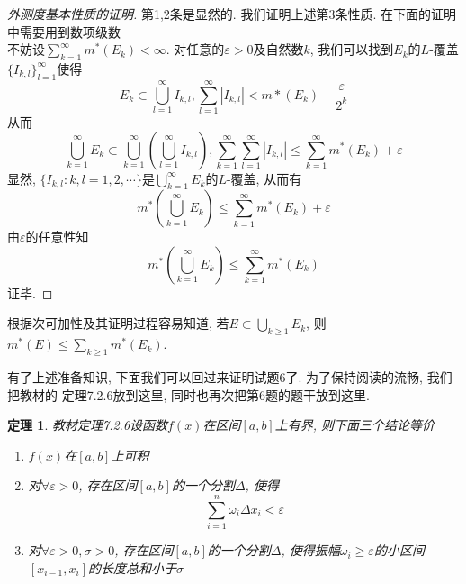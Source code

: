 \documentclass[a4paper,12pt]{article}
\theoremstyle{nonumberplain}
\newtheorem{theorem}{定理}
\begin{document}
\begin{proof}[外测度基本性质的证明]
  第1,2条是显然的. 我们证明上述第3条性质. 在下面的证明中需要用到数项级数 \\
  不妨设$\sum_{k=1}^{\infty}m^*(E_k)<\infty$. 对任意的$\varepsilon>0$及自然数$k$, 
  我们可以找到$E_k$的$L$-覆盖$\{I_{k,l}\}_{l=1}^{\infty}$使得
  \[E_k\subset\bigcup_{l=1}^{\infty}I_{k,l},\sum_{l=1}^{\infty}|I_{k,l}|<m*(E_k)+\frac{\varepsilon}{2^k}\]
  从而
  \[\bigcup_{k=1}^{\infty}E_k\subset\bigcup_{k=1}^{\infty}(\bigcup_{l=1}^{\infty}I_{k,l}),
  \sum_{k=1}^{\infty}\sum_{l=1}^{\infty}|I_{k,l}|\leq \sum_{k=1}^\infty m^*(E_k)+\varepsilon
  \]
  显然, $\{I_{k,l}:k,l=1,2,\cdots\}$是$\bigcup_{k=1}^\infty E_k$的$L$-覆盖, 从而有
  \[m^*(\bigcup_{k=1}^{\infty}E_k)\leq \sum_{k=1}^\infty m^*(E_k)+\varepsilon\]
  由$\varepsilon$的任意性知
  \[m^*(\bigcup_{k=1}^{\infty}E_k)\leq \sum_{k=1}^\infty m^*(E_k)\]
  证毕.
\end{proof}
根据次可加性及其证明过程容易知道, 若$E\subset \bigcup_{k\geq1} E_k$, 则$m^*(E)\leq \sum_{k\geq1}m^*(E_k)$.

有了上述准备知识, 下面我们可以回过来证明试题6了. 为了保持阅读的流畅, 我们把教材的
定理7.2.6放到这里, 同时也再次把第6题的题干放到这里.
\begin{theorem}{教材定理7.2.6}\label{thm:integrability}
  设函数$f(x)$在区间$[a,b]$上有界, 则下面三个结论等价
  \begin{enumerate}
    \item $f(x)$在$[a,b]$上可积
    \item 对$\forall \varepsilon>0$, 存在区间$[a,b]$的一个分割$\Delta$, 使得
      \[\sum_{i=1}^{n}\omega_i\Delta x_i<\varepsilon\]
    \item 对$\forall \varepsilon>0,\sigma>0$, 存在区间$[a,b]$的一个分割$\Delta$, 
  使得振幅$\omega_i\geq\varepsilon$的小区间$[x_{i-1},x_{i}]$的长度总和小于$\sigma$
  \end{enumerate}
\end{theorem}
\end{document}
